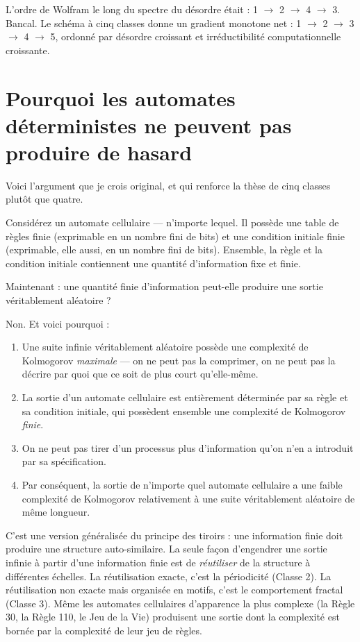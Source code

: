 \documentclass[11pt, twoside, openright]{book}
\begin{document}
L'ordre de Wolfram le long du spectre du désordre était : 1 $\rightarrow$ 2 $\rightarrow$ 4 $\rightarrow$ 3. Bancal. Le schéma à cinq classes donne un gradient monotone net : 1 $\rightarrow$ 2 $\rightarrow$ 3 $\rightarrow$ 4 $\rightarrow$ 5, ordonné par désordre croissant et irréductibilité computationnelle croissante.

\section*{Pourquoi les automates déterministes ne peuvent pas produire de hasard}

Voici l'argument que je crois original, et qui renforce la thèse de cinq classes plutôt que quatre.

Considérez un automate cellulaire --- n'importe lequel. Il possède une table de règles finie (exprimable en un nombre fini de bits) et une condition initiale finie (exprimable, elle aussi, en un nombre fini de bits). Ensemble, la règle et la condition initiale contiennent une quantité d'information fixe et finie.

Maintenant : une quantité finie d'information peut-elle produire une sortie véritablement aléatoire ?

Non. Et voici pourquoi :

\begin{enumerate}
  \item Une suite infinie véritablement aléatoire possède une complexité de Kolmogorov \textit{maximale} --- on ne peut pas la comprimer, on ne peut pas la décrire par quoi que ce soit de plus court qu'elle-même.
  \item La sortie d'un automate cellulaire est entièrement déterminée par sa règle et sa condition initiale, qui possèdent ensemble une complexité de Kolmogorov \textit{finie}.
  \item On ne peut pas tirer d'un processus plus d'information qu'on n'en a introduit par sa spécification.
  \item Par conséquent, la sortie de n'importe quel automate cellulaire a une faible complexité de Kolmogorov relativement à une suite véritablement aléatoire de même longueur.
\end{enumerate}

C'est une version généralisée du principe des tiroirs : une information finie doit produire une structure auto-similaire. La seule façon d'engendrer une sortie infinie à partir d'une information finie est de \textit{réutiliser} de la structure à différentes échelles. La réutilisation exacte, c'est la périodicité (Classe 2). La réutilisation non exacte mais organisée en motifs, c'est le comportement fractal (Classe 3). Même les automates cellulaires d'apparence la plus complexe (la Règle 30, la Règle 110, le Jeu de la Vie) produisent une sortie dont la complexité est bornée par la complexité de leur jeu de règles.
\end{document}
